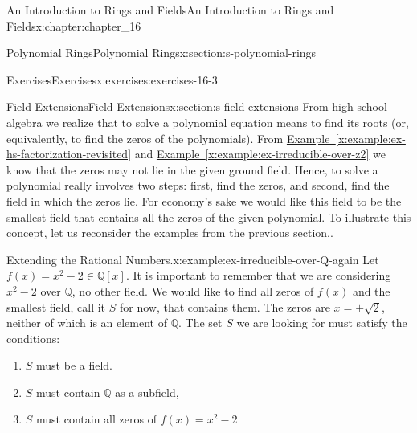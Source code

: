 \documentclass[oneside,10pt,]{book}
\newcommand{\xreffont}{\relax}
\numberwithin{equation}{section}
\begin{document}
\begin{chapterptx}{An Introduction to Rings and Fields}{}{An Introduction to Rings and Fields}{}{}{x:chapter:chapter_16}
\begin{sectionptx}{Polynomial Rings}{}{Polynomial Rings}{}{}{x:section:s-polynomial-rings}
\begin{exercises-subsection}{Exercises}{}{Exercises}{}{}{x:exercises:exercises-16-3}
\end{exercises-subsection}
\end{sectionptx}
%
%
\typeout{************************************************}
\typeout{************************************************}
%
\begin{sectionptx}{Field Extensions}{}{Field Extensions}{}{}{x:section:s-field-extensions}
From high school algebra we realize that to solve a polynomial equation means to find its roots (or, equivalently, to find the zeros of the polynomials). From \hyperref[x:example:ex-hs-factorization-revisited]{Example~{\xreffont\ref{x:example:ex-hs-factorization-revisited}}} and \hyperref[x:example:ex-irreducible-over-z2]{Example~{\xreffont\ref{x:example:ex-irreducible-over-z2}}} we know that the zeros may not lie in the given ground field. Hence, to solve a polynomial really involves two steps: first, find the zeros, and second, find the field in which the zeros lie. For economy's sake we would like this field to be the smallest field that contains all the zeros of the given polynomial. To illustrate this concept, let us reconsider the examples from the previous section..%
\begin{example}{Extending the Rational Numbers.}{x:example:ex-irreducible-over-Q-again}%
Let \(f(x)=x^2 - 2 \in  \mathbb{Q}[x]\). It is important to remember that we are considering \(x^2-2\) over \(\mathbb{Q}\), no other field. We would like to find all zeros of \(f(x)\) and the smallest field, call it \(S\) for now, that contains them. The zeros are \(x= \pm \sqrt{2}\), neither of which is an element of \(\mathbb{Q}\). The set \(S\) we are looking for must satisfy the conditions:%
\begin{enumerate}[label=(\arabic*)]
\item{}\(S\) must be a field.%
\item{}\(S\) must contain \(\mathbb{Q}\) as a subfield,%
\item{}\(S\) must contain all zeros of \(f(x)=x^2 - 2\)%
\end{enumerate}
%
\par

\end{example}
\end{sectionptx}
\end{chapterptx}
\end{document}
